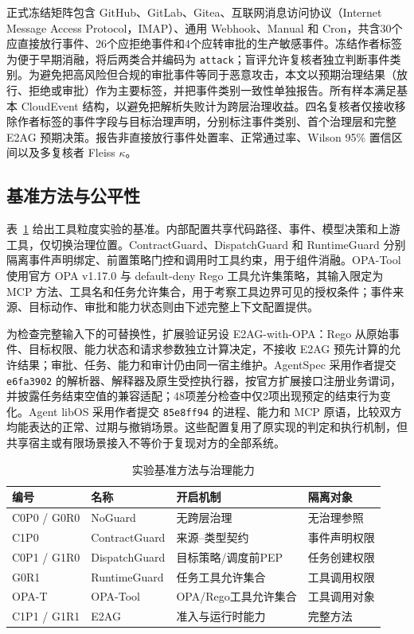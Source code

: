 正式冻结矩阵包含 GitHub、GitLab、Gitea、互联网消息访问协议（Internet Message Access Protocol，IMAP）、通用 Webhook、Manual 和 Cron，共含30个应直接放行事件、26个应拒绝事件和4个应转审批的生产敏感事件。冻结作者标签为便于早期消融，将后两类合并编码为 \texttt{attack}；盲评允许复核者独立判断事件类别。为避免把高风险但合规的审批事件等同于恶意攻击，本文以预期治理结果（放行、拒绝或审批）作为主要标签，并把事件类别一致性单独报告。所有样本满足基本 CloudEvent 结构，以避免把解析失败计为跨层治理收益。四名复核者仅接收移除作者标签的事件字段与目标治理声明，分别标注事件类别、首个治理层和完整 E2AG 预期决策。报告非直接放行事件处置率、正常通过率、Wilson 95\% 置信区间以及多复核者 Fleiss $\kappa$。

\subsection{基准方法与公平性}

表~\ref{tab:baselines-v11} 给出工具粒度实验的基准。内部配置共享代码路径、事件、模型决策和上游工具，仅切换治理位置。ContractGuard、DispatchGuard 和 RuntimeGuard 分别隔离事件声明绑定、前置策略门控和调用时工具约束，用于组件消融。OPA-Tool 使用官方 OPA v1.17.0 与 default-deny Rego 工具允许集策略\cite{opa}，其输入限定为 MCP 方法、工具名和任务允许集合，用于考察工具边界可见的授权条件；事件来源、目标动作、审批和能力状态则由下述完整上下文配置提供。

为检查完整输入下的可替换性，扩展验证另设 E2AG-with-OPA：Rego 从原始事件、目标权限、能力状态和请求参数独立计算决定，不接收 E2AG 预先计算的允许结果；审批、任务、能力和审计仍由同一宿主维护。AgentSpec 采用作者提交 \texttt{e6fa3902} 的解析器、解释器及原生受控执行器，按官方扩展接口注册业务谓词，并披露任务结束空值的兼容适配；48项差分检查中仅2项出现预定的结束行为变化。Agent libOS 采用作者提交 \texttt{85e8ff94} 的进程、能力和 MCP 原语，比较双方均能表达的正常、过期与撤销场景。这些配置复用了原实现的判定和执行机制，但共享宿主或有限场景接入不等价于复现对方的全部系统。

\begin{table}[htbp]
\centering
\caption{实验基准方法与治理能力}
\label{tab:baselines-v11}
\small
\begin{tabular}{llll}
\toprule
编号 & 名称 & 开启机制 & 隔离对象 \\
\midrule
C0P0 / G0R0 & NoGuard & 无跨层治理 & 无治理参照 \\
C1P0 & ContractGuard & 来源--类型契约 & 事件声明权限 \\
C0P1 / G1R0 & DispatchGuard & 目标策略/调度前PEP & 任务创建权限 \\
G0R1 & RuntimeGuard & 任务工具允许集合 & 工具调用权限 \\
OPA-T & OPA-Tool & OPA/Rego工具允许集合 & 工具调用对象 \\
C1P1 / G1R1 & E2AG & 准入与运行时能力 & 完整方法 \\
\bottomrule
\end{tabular}
\end{table}

